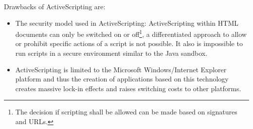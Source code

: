 Drawbacks of ActiveScripting are:

\begin{itemize}
  \item The security model used in ActiveScripting: ActiveScripting within HTML documents can only be switched on or off\footnote{The decision if scripting shall be allowed can be made based on signatures and URLs.}, a differentiated approach to allow or prohibit specific actions of a script is not possible. It also is impossible to run scripts in a secure environment similar to the Java sandbox.
  \item ActiveScripting is limited to the Microsoft Windows/Internet Explorer platform and thus the creation of applications based on this technology creates massive lock-in effects and raises switching costs to other platforms.
\end{itemize}